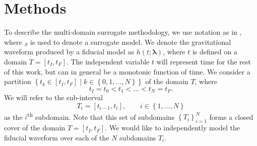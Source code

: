 \documentclass[aps,prd,amsmath,floats,floatfix, twocolumn,
superscriptaddress,nofootinbib,showpacs,longbibliography]{revtex4-1}
\begin{document}
\section{Methods}
\label{sec:methods}
To describe the multi-domain surrogate methodology, we use notation as in \cite{Field:2013cfa}, where $_S$ is used to denote a surrogate model. We denote the gravitational waveform produced by a fiducial model as $h(t;\bm{\lambda})$, where $t$ is defined on a domain $T=[t_I, t_F]$. The independent variable $t$ will represent time for the rest of this work, but can in general be a monotonic function of time. We consider a partition $\left\{t_k\in[t_I, t_F]\mid k\in\left\{0,1,\ldots,N\right\}\right\}$ of the domain $T$, where
\begin{equation}
    t_I=t_0 < t_1 < \ldots < t_{N} = t_F.
\end{equation}
We will refer to the sub-interval 
\begin{equation}
    T_i=[t_{i-1}, t_{i}],\qquad i\in\left\{1,\ldots,N\right\}
\end{equation}
as the $i$\textsuperscript{th} subdomain. Note that this set of subdomains $\left\{T_i\right\}_{i=1}^{N}$ forms a closed cover of the domain $T=[t_I, t_F]$. We would like to independently model the fiducial waveform over each of the $N$ subdomains $T_i$.
\end{document}

